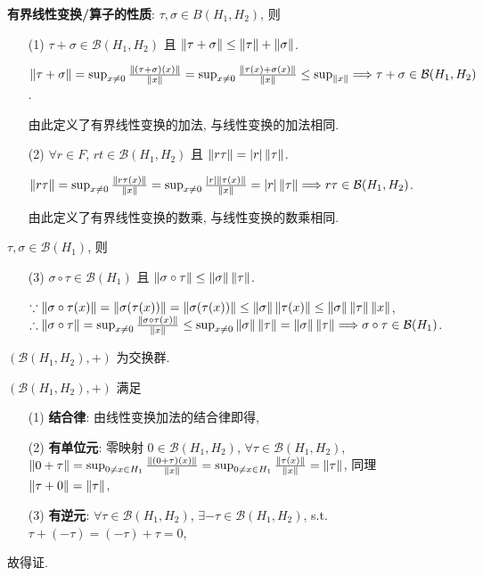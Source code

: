 \documentclass{note}
\begin{document}
\textbf{有界线性变换/算子的性质}: $\tau,\sigma\in B(H_1,H_2)$, 则
\begin{itemize}
    \item[(1)] $\tau+\sigma\in\mathcal{B}(H_1,H_2)$ 且 $\left\lVert\tau+\sigma\right\rVert\leq\left\lVert\tau\right\rVert+\left\lVert\sigma\right\rVert$.
    \begin{pf}
        $\left\lVert\tau+\sigma\right\rVert=\sup_{x\neq 0}\frac{\left\lVert(\tau+\sigma)(x)\right\rVert}{\left\lVert x\right\rVert}=\sup_{x\neq 0}\frac{\left\lVert\tau(x)+\sigma(x)\right\rVert}{\left\lVert x\right\rVert}\leq\sup_{\left\lVert x\right\rVert}\Longrightarrow\tau+\sigma\in\mathcal{B}(H_1,H_2)$.
    \end{pf}

    由此定义了有界线性变换的加法, 与线性变换的加法相同.
    \item[(2)] $\forall r\in F$, $rt\in\mathcal{B}(H_1,H_2)$ 且 $\left\lVert r\tau\right\rVert=\left\lvert r\right\rvert\left\lVert\tau\right\rVert$.
    \begin{pf}
        $\left\lVert r\tau\right\rVert=\sup_{x\neq 0}\frac{\left\lVert r\tau(x)\right\rVert}{\left\lVert x\right\rVert}=\sup_{x\neq 0}\frac{\left\lvert r\right\rvert\left\lVert\tau(x)\right\rVert}{\left\lVert x\right\rVert}=\left\lvert r\right\rvert\left\lVert\tau\right\rVert\Longrightarrow r\tau\in\mathcal{B}(H_1,H_2)$.
    \end{pf}

    由此定义了有界线性变换的数乘, 与线性变换的数乘相同.
\end{itemize}
$\tau,\sigma\in\mathcal{B}(H_1)$, 则
\begin{itemize}
    \item[(3)] $\sigma\circ\tau\in\mathcal{B}(H_1)$ 且 $\left\lVert\sigma\circ\tau\right\rVert\leq\left\lVert\sigma\right\rVert\left\lVert\tau\right\rVert$.
    \begin{pf}
        $\because\left\lVert\sigma\circ\tau(x)\right\rVert=\left\lVert\sigma(\tau(x))\right\rVert=\left\lVert\sigma(\tau(x))\right\rVert\leq\left\lVert\sigma\right\rVert\left\lVert\tau(x)\right\rVert\leq\left\lVert\sigma\right\rVert\left\lVert\tau\right\rVert\left\lVert x\right\rVert$, $\therefore\left\lVert\sigma\circ\tau\right\rVert=\sup_{x\neq 0}\frac{\left\lVert\sigma\circ\tau(x)\right\rVert}{\left\lVert x\right\rVert}\leq\sup_{x\neq 0}\left\lVert\sigma\right\rVert\left\lVert\tau\right\rVert=\left\lVert\sigma\right\rVert\left\lVert\tau\right\rVert\Longrightarrow\sigma\circ\tau\in\mathcal{B}(H_1)$.
    \end{pf}
\end{itemize}

$(\mathcal{B}(H_1,H_2),+)$ 为交换群.
\begin{pf}
    $(\mathcal{B}(H_1,H_2),+)$ 满足
    \begin{itemize}
        \item[(1)] \textbf{结合律}: 由线性变换加法的结合律即得,
        \item[(2)] \textbf{有单位元}: 零映射 $0\in\mathcal{B}(H_1,H_2)$, $\forall\tau\in\mathcal{B}(H_1,H_2)$, $\left\lVert0+\tau\right\rVert=\sup_{0\neq x\in H_1}\frac{\left\lVert(0+\tau)(x)\right\rVert}{\left\lVert x\right\rVert}=\sup_{0\neq x\in H_1}\frac{\left\lVert\tau(x)\right\rVert}{\left\lVert x\right\rVert}=\left\lVert\tau\right\rVert$, 同理 $\left\lVert\tau+0\right\rVert=\left\lVert\tau\right\rVert$,
        \item[(3)] \textbf{有逆元}: $\forall\tau\in\mathcal{B}(H_1,H_2)$, $\exists-\tau\in\mathcal{B}(H_1,H_2)$, s.t. $\tau+(-\tau)=(-\tau)+\tau=0$,
    \end{itemize}
    故得证.
\end{pf}
\end{document}
